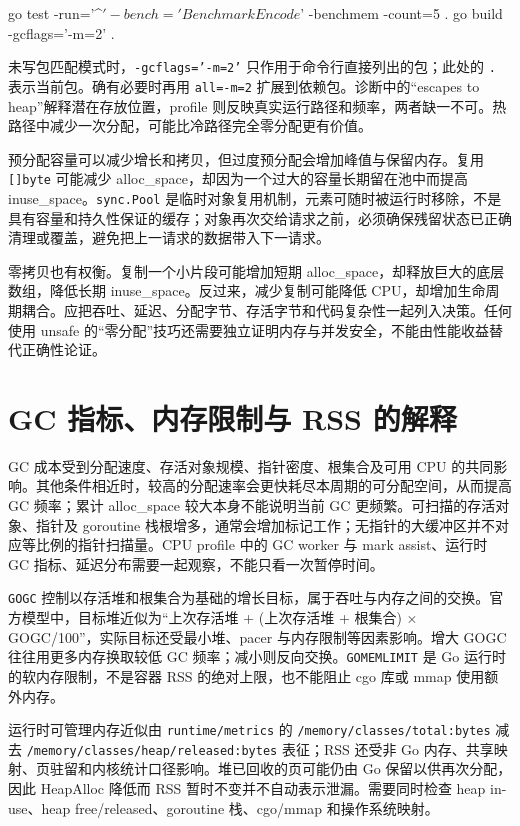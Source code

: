 \documentclass[UTF8,fontset=fandol,openany,11pt]{ctexbook}
\begin{document}
\begin{codeblock}
go test -run='^$' -bench='BenchmarkEncode$' -benchmem -count=5 .
go build -gcflags='-m=2' .
\end{codeblock}

未写包匹配模式时，\texttt{-\allowbreak{}gcflags='-\allowbreak{}m=2'} 只作用于命令行直接列出的包；此处的 \texttt{.\allowbreak{}} 表示当前包。确有必要时再用 \texttt{all=-\allowbreak{}m=2} 扩展到依赖包。诊断中的“escapes to heap”解释潜在存放位置，profile 则反映真实运行路径和频率，两者缺一不可。热路径中减少一次分配，可能比冷路径完全零分配更有价值。

预分配容量可以减少增长和拷贝，但过度预分配会增加峰值与保留内存。复用 \texttt{[]byte} 可能减少 alloc\_space，却因为一个过大的容量长期留在池中而提高 inuse\_space。\texttt{sync.\allowbreak{}Pool} 是临时对象复用机制，元素可随时被运行时移除，不是具有容量和持久性保证的缓存；对象再次交给请求之前，必须确保残留状态已正确清理或覆盖，避免把上一请求的数据带入下一请求。

零拷贝也有权衡。复制一个小片段可能增加短期 alloc\_space，却释放巨大的底层数组，降低长期 inuse\_space。反过来，减少复制可能降低 CPU，却增加生命周期耦合。应把吞吐、延迟、分配字节、存活字节和代码复杂性一起列入决策。任何使用 unsafe 的“零分配”技巧还需要独立证明内存与并发安全，不能由性能收益替代正确性论证。

\section{GC 指标、内存限制与 RSS 的解释}
GC 成本受到分配速度、存活对象规模、指针密度、根集合及可用 CPU 的共同影响。其他条件相近时，较高的分配速率会更快耗尽本周期的可分配空间，从而提高 GC 频率；累计 alloc\_space 较大本身不能说明当前 GC 更频繁。可扫描的存活对象、指针及 goroutine 栈根增多，通常会增加标记工作；无指针的大缓冲区并不对应等比例的指针扫描量。CPU profile 中的 GC worker 与 mark assist、运行时 GC 指标、延迟分布需要一起观察，不能只看一次暂停时间。

\texttt{GOGC} 控制以存活堆和根集合为基础的增长目标，属于吞吐与内存之间的交换。官方模型中，目标堆近似为“上次存活堆 + (上次存活堆 + 根集合) \ensuremath{\times} GOGC/100”，实际目标还受最小堆、pacer 与内存限制等因素影响。增大 GOGC 往往用更多内存换取较低 GC 频率；减小则反向交换。\texttt{GOMEMLIMIT} 是 Go 运行时的软内存限制，不是容器 RSS 的绝对上限，也不能阻止 cgo 库或 mmap 使用额外内存。\cite{tools-gc-guide}

运行时可管理内存近似由 \texttt{runtime/\allowbreak{}metrics} 的 \texttt{/\allowbreak{}memory/\allowbreak{}classes/\allowbreak{}total:\allowbreak{}bytes} 减去 \texttt{/\allowbreak{}memory/\allowbreak{}classes/\allowbreak{}heap/\allowbreak{}released:\allowbreak{}bytes} 表征；RSS 还受非 Go 内存、共享映射、页驻留和内核统计口径影响。堆已回收的页可能仍由 Go 保留以供再次分配，因此 HeapAlloc 降低而 RSS 暂时不变并不自动表示泄漏。需要同时检查 heap in-use、heap free/released、goroutine 栈、cgo/mmap 和操作系统映射。\cite{tools-metrics}
\end{document}

